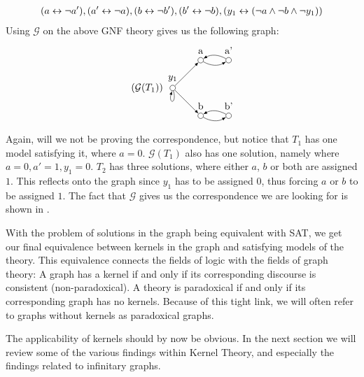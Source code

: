 \begin{example}
  \begin{align}
    ( a \leftrightarrow \neg a'), (a' \leftrightarrow \neg a), (b \leftrightarrow \neg b'), (b' \leftrightarrow \neg b), (y_1 \leftrightarrow (\neg a \wedge \neg b \wedge \neg y_1))
  \end{align}
  Using $\mathcal{G}$ on the above GNF theory gives us the following graph:
  \[
    \begin{tikzpicture}
      [
      point/.style={circle,draw,inner sep=0pt,minimum size=2mm},
      collection/.style={thick,rectangle,draw,inner sep=0pt,minimum height=14mm, minimum width= 9mm}
      ]
      \node (label) at (5,1) [label=left:$(\mathcal{G}(T_1))\;$] {};
      \node (0) at (5,1) [point,label=above:$y_1$] {};
      \node (1) at (6,0) [point,label=above:b] {};
      \node (2) at (7,0) [point,label=above:b'] {};
      \node (3) at (6,2) [point,label=above:a] {};
      \node (4) at (7,2) [point,label=above:a'] {};
      \draw [-latex, loop below] (0) to (0);
      \draw [-latex] (0) to (1);
      \draw [-latex, bend right] (1) to (2);
      \draw [-latex, bend right] (2) to (1);
      \draw [-latex] (0) to (3);
      \draw [-latex, bend right] (3) to (4);
      \draw [-latex, bend right] (4) to (3);
    \end{tikzpicture}
  \]
\end{example}
Again, will we not be proving the correspondence, but notice that $T_1$ has one model satisfying it, where $a = 0$.
$\mathcal{G}(T_1)$ also has one solution, namely where $a = 0, a' = 1, y_1 = 0$.
$T_2$ has three solutions, where either $a$, $b$ or both are assigned $1$.
This reflects onto the graph since $y_1$ has to be assigned $0$, thus forcing $a$ or $b$ to be assigned $1$.
The fact that $\mathcal{G}$ gives us the correspondence we are looking for is shown in \cite{apal-digraph}.

With the problem of solutions in the graph being equivalent with SAT, we get our final equivalence between kernels in the graph and satisfying models of the theory.
This equivalence connects the fields of logic with the fields of graph theory:
A graph has a kernel if and only if its corresponding discourse is consistent (non-paradoxical).
A theory is paradoxical if and only if its corresponding graph has no kernels.
Because of this tight link, we will often refer to graphs without kernels as paradoxical graphs.

The applicability of kernels should by now be obvious.
In the next section we will review some of the various findings within Kernel Theory, and especially the findings related to infinitary graphs.
